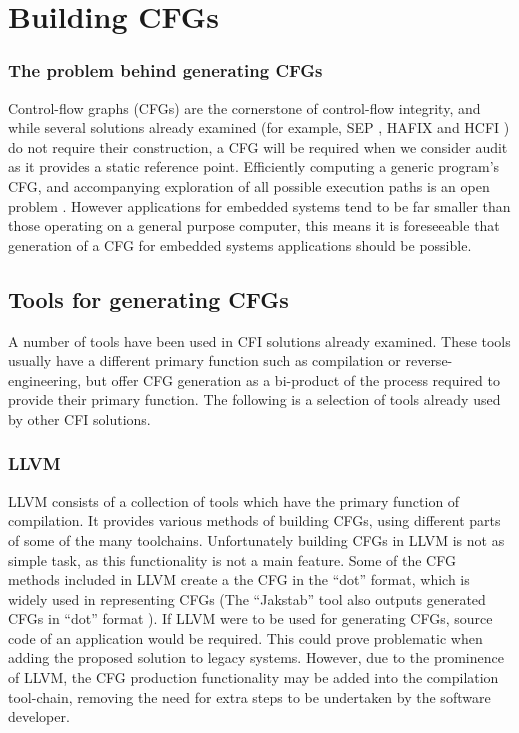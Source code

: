 \section{Building CFGs}

\subsubsection*{The problem behind generating CFGs}

Control-flow graphs (CFGs) are the cornerstone of control-flow integrity, and while several solutions already examined (for example, SEP \cite{Lee2019}, HAFIX \cite{Davi2015} and HCFI \cite{Danger2018}) do not require their construction, a CFG will be required when we consider audit as it provides a static reference point. Efficiently computing a generic program's CFG, and accompanying exploration of all possible execution paths is an open problem \cite{Abera2016}. However applications for embedded systems tend to be far smaller than those operating on a general purpose computer, this means it is foreseeable that generation of a CFG for embedded systems applications should be possible.

\subsection{Tools for generating CFGs}

A number of tools have been used in CFI solutions already examined. These tools usually have a different primary function such as compilation or reverse-engineering, but offer CFG generation as a bi-product of the process required to provide their primary function. The following is a selection of tools already used by other CFI solutions.

\subsubsection*{LLVM}

LLVM \cite{LLVM:CGO04} consists of a collection of tools which have the primary function of compilation. It provides various methods of building CFGs, using different parts of some of the many toolchains. Unfortunately building CFGs in LLVM is not as simple task, as this functionality is not a main feature. Some of the CFG methods included in LLVM create a the CFG in the ``dot'' format, which is widely used in representing CFGs (The ``Jakstab'' tool also outputs generated CFGs in ``dot'' format \cite{Kinder2008}). If LLVM were to be used for generating CFGs, source code of an application would be required. This could prove problematic when adding the proposed solution to legacy systems. However, due to the prominence of LLVM, the CFG production functionality may be added into the compilation tool-chain, removing the need for extra steps to be undertaken by the software developer.

